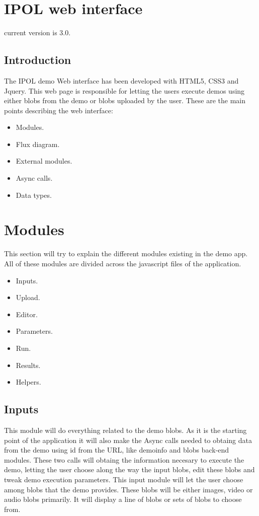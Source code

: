 
\section{IPOL web interface}

current version is 3.0.

\subsection{Introduction}
The IPOL demo Web interface has been developed with HTML5, CSS3 and Jquery. 
This web page is responsible for letting the users execute demos using either blobs 
from the demo or blobs uploaded by the user.
These are the main points describing the web interface:
\begin{itemize}
  \item Modules.
  \item Flux diagram.
  \item External modules.
  \item Async calls.
  \item Data types.
\end{itemize}



\section{Modules}
This section will try to explain the different modules existing in the demo app. All of these
 modules are divided across the javascript files of the application.
\begin{itemize}
	\item Inputs.
	\item Upload.
	\item Editor.
	\item Parameters.
	\item Run.
	\item Results.
	\item Helpers.
\end{itemize}

\subsection{Inputs}
This module will do everything related to the demo blobs. As it is the starting point of the 
application it will also make the Async calls needed to obtaing data from the demo using id from the URL, like demoinfo 
and blobs back-end modules. These two calls will obtaing the information necesary to execute the demo, letting the 
user choose along the way the input blobs, edit these blobs and tweak demo execution parameters.
This input module will let the user choose among blobs that the demo provides. These blobs will be either images, video or 
audio blobs primarily. It will display a line of blobs or sets of blobs to choose from.


